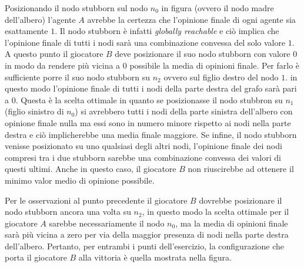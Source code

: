 
\begin{alphaparts}
    \questionpart %
Posizionando il nodo stubborn sul nodo $n_0$ in figura (ovvero il nodo madre dell’albero) l’agente $A$ avrebbe la certezza che l’opinione finale di ogni agente sia esattamente $1$. Il nodo stubborn è infatti \textit{globally reachable} e ciò implica che l’opinione finale di tutti i nodi sarà una combinazione convessa del solo valore $1$. 
A questo punto il giocatore $B$ deve posizionare il suo nodo stubborn con valore $0$ in modo da rendere più vicina a $0$ possibile la media di opinioni finale.
Per farlo è sufficiente porre il suo nodo stubborn su $n_2$ ovvero sul figlio destro del nodo $1$. in questo modo l’opinione finale di tutti i nodi della parte destra del grafo sarà pari a $0$.
Questa è la scelta ottimale in quanto se posizionasse il nodo stubbron su $n_1$ (figlio sinistro di $n_0$) si avrebbero tutti i nodi della parte sinistra dell’albero con opinione finale nulla ma essi sono in numero minore rispetto ai nodi nella parte destra e ciò implicherebbe una media finale maggiore.
Se infine, il nodo stubborn venisse posizionato su uno qualsiasi degli altri nodi, l’opinione finale dei nodi compresi tra i due stubborn sarebbe una combinazione convessa dei valori di questi ultimi. Anche in questo caso, il giocatore $B$ non riuscirebbe ad ottenere il minimo valor medio di opinione possibile. 
   

    

    \questionpart %

Per le osservazioni al punto precedente il giocatore $B$ dovrebbe posizionare il nodo stubborn ancora una volta su $n_2$, in questo modo la scelta ottimale per il giocatore $A$ sarebbe necessariamente il nodo $n_0$, ma la media di opinioni finale sarà più vicina a zero per via della maggior presenza di nodi nella parte destra dell’albero.
Pertanto, per entrambi i punti dell'esercizio, la configurazione che porta il giocatore \(B\) alla vittoria è quella mostrata nella figura.
    
\end{alphaparts}
